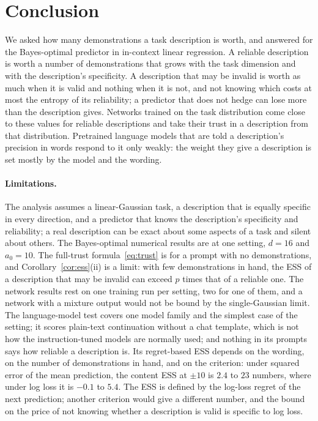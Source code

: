\documentclass[10pt]{article}
\begin{document}
\section{Conclusion}
We asked how many demonstrations a task description is worth, and answered for the Bayes-optimal predictor in in-context linear regression. A reliable description is worth a number of demonstrations that grows with the task dimension and with the description's specificity. A description that may be invalid is worth as much when it is valid and nothing when it is not, and not knowing which costs at most the entropy of its reliability; a predictor that does not hedge can lose more than the description gives. Networks trained on the task distribution come close to these values for reliable descriptions and take their trust in a description from that distribution. Pretrained language models that are told a description's precision in words respond to it only weakly: the weight they give a description is set mostly by the model and the wording.

\paragraph{Limitations.} The analysis assumes a linear-Gaussian task, a description that is equally specific in every direction, and a predictor that knows the description's specificity and reliability; a real description can be exact about some aspects of a task and silent about others. The Bayes-optimal numerical results are at one setting, $d = 16$ and $a_0 = 10$. The full-trust formula~\eqref{eq:trust} is for a prompt with no demonstrations, and Corollary~\ref{cor:ess}(ii) is a limit: with few demonstrations in hand, the ESS of a description that may be invalid can exceed $p$ times that of a reliable one. The network results rest on one training run per setting, two for one of them, and a network with a mixture output would not be bound by the single-Gaussian limit. The language-model test covers one model family and the simplest case of the setting; it scores plain-text continuation without a chat template, which is not how the instruction-tuned models are normally used; and nothing in its prompts says how reliable a description is. Its regret-based ESS depends on the wording, on the number of demonstrations in hand, and on the criterion: under squared error of the mean prediction, the content ESS at $\pm 10$ is $2.4$ to $23$ numbers, where under log loss it is $-0.1$ to $5.4$. The ESS is defined by the log-loss regret of the next prediction; another criterion would give a different number, and the bound on the price of not knowing whether a description is valid is specific to log loss.
\end{document}
